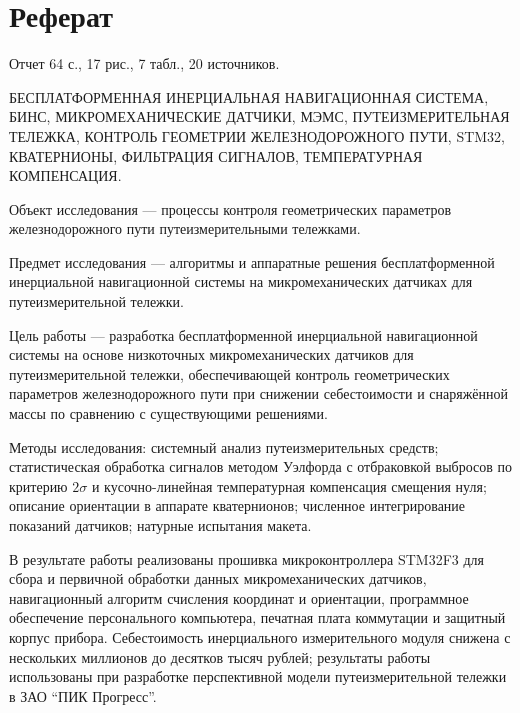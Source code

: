 \chapter*{Реферат}


Отчет 64 с., 17 рис., 7 табл., 20 источников.

БЕСПЛАТФОРМЕННАЯ ИНЕРЦИАЛЬНАЯ НАВИГАЦИОННАЯ СИСТЕМА, БИНС, МИКРОМЕХАНИЧЕСКИЕ ДАТЧИКИ, МЭМС, ПУТЕИЗМЕРИТЕЛЬНАЯ ТЕЛЕЖКА, КОНТРОЛЬ ГЕОМЕТРИИ ЖЕЛЕЗНОДОРОЖНОГО ПУТИ, STM32, КВАТЕРНИОНЫ, ФИЛЬТРАЦИЯ СИГНАЛОВ, ТЕМПЕРАТУРНАЯ КОМПЕНСАЦИЯ.

Объект исследования --- процессы контроля геометрических параметров железнодорожного пути путеизмерительными тележками.

Предмет исследования --- алгоритмы и аппаратные решения бесплатформенной инерциальной навигационной системы на микромеханических датчиках для путеизмерительной тележки.

Цель работы --- разработка бесплатформенной инерциальной навигационной системы на основе низкоточных микромеханических датчиков для путеизмерительной тележки, обеспечивающей контроль геометрических параметров железнодорожного пути при снижении себестоимости и снаряжённой массы по сравнению с существующими решениями.

Методы исследования: системный анализ путеизмерительных средств; статистическая обработка сигналов методом Уэлфорда с отбраковкой выбросов по критерию $2\sigma$ и кусочно-линейная температурная компенсация смещения нуля; описание ориентации в аппарате кватернионов; численное интегрирование показаний датчиков; натурные испытания макета.

В результате работы реализованы прошивка микроконтроллера STM32F3 для сбора и первичной обработки данных микромеханических датчиков, навигационный алгоритм счисления координат и ориентации, программное обеспечение персонального компьютера, печатная плата коммутации и защитный корпус прибора. Себестоимость инерциального измерительного модуля снижена с нескольких миллионов до десятков тысяч рублей; результаты работы использованы при разработке перспективной модели путеизмерительной тележки в ЗАО \enquote{ПИК Прогресс}.

\newpage